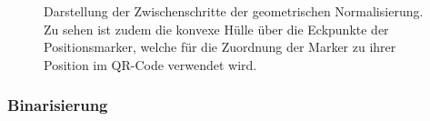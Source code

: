 \documentclass[a4paper, oneside, 12pt]{article}
\begin{document}
\begin{figure}[h]
	\begin{center}
	\end{center}
	\caption{Darstellung der Zwischenschritte der geometrischen Normalisierung. Zu sehen ist zudem die konvexe Hülle über die Eckpunkte der Positionsmarker, welche für die Zuordnung der Marker zu ihrer Position im QR-Code verwendet wird.}
	\label{fig:geometrie}
\end{figure}

\subsubsection{Binarisierung}
\end{document}
